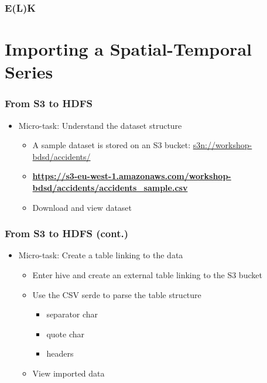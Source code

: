 \documentclass[hyperref={pdfpagelabels=true}]{beamer}
\begin{document}
\begin{frame}
\frametitle{E(L)K}
\end{frame}


\section{Importing a Spatial-Temporal Series} 

\begin{frame}
\frametitle{From S3 to HDFS}
\begin{itemize}
  \item<1->Micro-task: Understand the dataset structure
  \begin{itemize}
    \item<1->A sample dataset is stored on an S3 bucket: \url{s3n://workshop-bdsd/accidents/}
    \item<2->\textbf{\url{https://s3-eu-west-1.amazonaws.com/workshop-bdsd/accidents/accidents\_sample.csv}}
    \item<3->Download and view dataset
  \end{itemize}
\end{itemize}
\end{frame}

\begin{frame}
\frametitle{From S3 to HDFS (cont.)}
\begin{itemize}
  \item<1->Micro-task: Create a table linking to the data
  \begin{itemize}
    \item<1->Enter hive and create an external table linking to the S3 bucket
    \item<2->Use the CSV serde to parse the table structure
      \begin{itemize}
	\item<3->separator char
	\item<3->quote char
	\item<3->headers
       \end{itemize}
    \item<4->View imported data       
  \end{itemize}
\end{itemize}
\end{frame}
\end{document}
